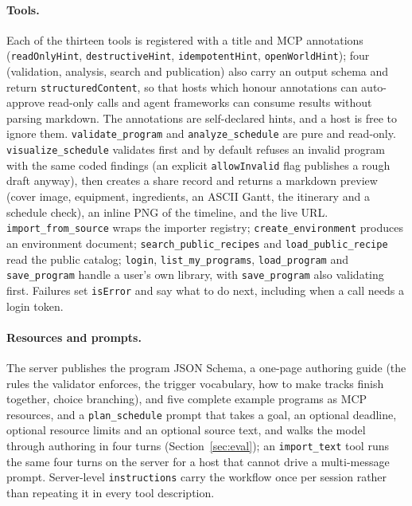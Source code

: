 \documentclass[10pt]{article}
\newcommand{\code}[1]{\texttt{#1}}
\begin{document}
\paragraph{Tools.} Each of the thirteen tools is registered with a title and MCP annotations (\code{readOnlyHint}, \code{destructiveHint}, \code{idempotentHint}, \code{openWorldHint}); four (validation, analysis, search and publication) also carry an output schema and return \code{structuredContent}, so that hosts which honour annotations can auto-approve read-only calls and agent frameworks can consume results without parsing markdown. The annotations are self-declared hints, and a host is free to ignore them. \code{validate\_program} and \code{analyze\_schedule} are pure and read-only. \code{visualize\_schedule} validates first and by default refuses an invalid program with the same coded findings (an explicit \code{allowInvalid} flag publishes a rough draft anyway), then creates a share record and returns a markdown preview (cover image, equipment, ingredients, an ASCII Gantt, the itinerary and a schedule check), an inline PNG of the timeline, and the live URL. \code{import\_from\_source} wraps the importer registry; \code{create\_environment} produces an environment document; \code{search\_public\_recipes} and \code{load\_public\_recipe} read the public catalog; \code{login}, \code{list\_my\_programs}, \code{load\_program} and \code{save\_program} handle a user's own library, with \code{save\_program} also validating first. Failures set \code{isError} and say what to do next, including when a call needs a login token.

\paragraph{Resources and prompts.} The server publishes the program JSON Schema, a one-page authoring guide (the rules the validator enforces, the trigger vocabulary, how to make tracks finish together, choice branching), and five complete example programs as MCP resources, and a \code{plan\_schedule} prompt that takes a goal, an optional deadline, optional resource limits and an optional source text, and walks the model through authoring in four turns (Section~\ref{sec:eval}); an \code{import\_text} tool runs the same four turns on the server for a host that cannot drive a multi-message prompt. Server-level \code{instructions} carry the workflow once per session rather than repeating it in every tool description.
\end{document}
